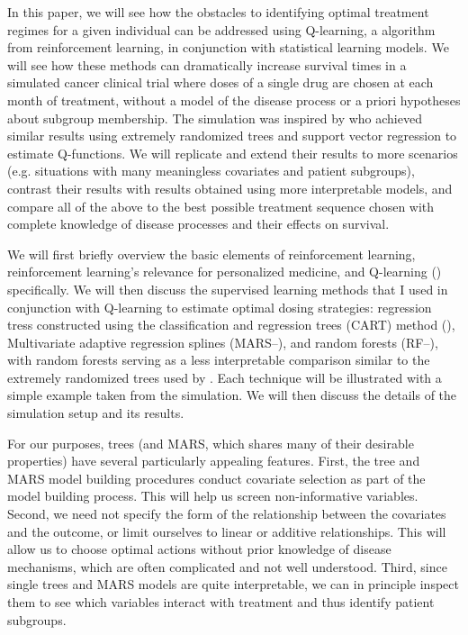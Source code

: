 \documentclass[12pt]{article}
\begin{document}
In this paper, we will see how the obstacles to identifying optimal treatment regimes for a given individual can be addressed using Q-learning, a algorithm from reinforcement learning, in conjunction with statistical learning models. We will see how these methods can dramatically increase survival times in a simulated cancer clinical trial where doses of a single drug are chosen at each month of treatment, without a model of the disease process or a priori hypotheses about subgroup membership. The simulation was inspired by \textcite{crt} who achieved similar results using extremely randomized trees and support vector regression to estimate Q-functions. We will replicate and extend their results to more scenarios (e.g. situations with many meaningless covariates and patient subgroups), contrast their results with results obtained using more interpretable models, and compare all of the above to the best possible treatment sequence chosen with complete knowledge of disease processes and their effects on survival.

We will first briefly overview the basic elements of reinforcement learning, reinforcement learning's relevance for personalized medicine, and Q-learning (\cite{Watkins1989}) specifically. We will then discuss the supervised learning methods that I used in conjunction with Q-learning to estimate optimal dosing strategies: regression tress constructed using the classification and regression trees (CART) method (\cite{CART}), Multivariate adaptive regression splines (MARS--\cite{mars}), and random forests (RF--\cite{rf}), with random forests serving as a less interpretable comparison similar to the extremely randomized trees used by \textcite{crt}. Each technique will be illustrated with a simple example taken from the simulation. We will then discuss the details of the simulation setup and its results.

For our purposes, trees (and MARS, which shares many of their desirable properties) have several particularly appealing features. First, the tree and MARS model building procedures conduct covariate selection as part of the model building process. This will help us screen non-informative variables. Second, we need not specify the form of the relationship between the covariates and the outcome, or limit ourselves to linear or additive relationships. This will allow us to choose optimal actions without prior knowledge of disease mechanisms, which are often complicated and not well understood. Third, since single trees and MARS models are quite interpretable, we can in principle inspect them to see which variables interact with treatment and thus identify patient subgroups.
\end{document}
